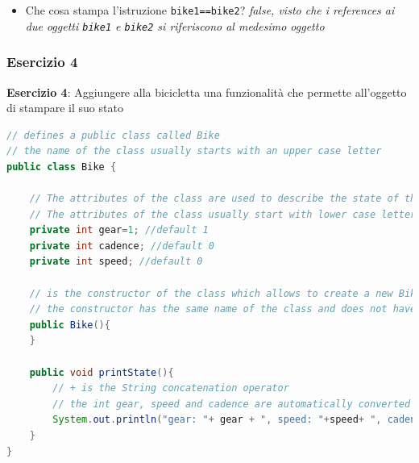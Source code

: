 \documentclass{article}
\theoremstyle{definition}
\begin{document}
\begin{itemize}
\item Che cosa stampa l'istruzione  \texttt{bike1==bike2}? \emph{false, visto che i references ai due oggetti  \texttt{bike1} e \texttt{bike2} si riferiscono al medesimo oggetto}
\end{itemize}


\subsubsection{Esercizio 4}
\begin{framed}
\textbf{Esercizio 4}: Aggiungere alla bicicletta una funzionalit\`a che permette all'oggetto di stampare il suo stato
\end{framed}

\begin{lstlisting}[language=Java,escapechar=|]
// defines a public class called Bike 
// the name of the class usually starts with an upper case letter
public class Bike {
	
	// The attributes of the class are used to describe the state of the class and are usually private or protected 
	// The attributes of the class usually start with lower case letters
	private int gear=1; //default 1
	private int cadence; //default 0
	private int speed; //default 0
	
	// is the constructor of the class which allows to create a new Bike
	// the constructor has the same name of the class and does not have a return type
	public Bike(){
	}
	
	public void printState(){
	    // + is the String concatenation operator
	    // the int gear, speed and cadence are automatically converted into String
		System.out.println("gear: "+ gear + ", speed: "+speed+ ", cadence: "+cadence);
	}
}
\end{lstlisting}
\end{document}
